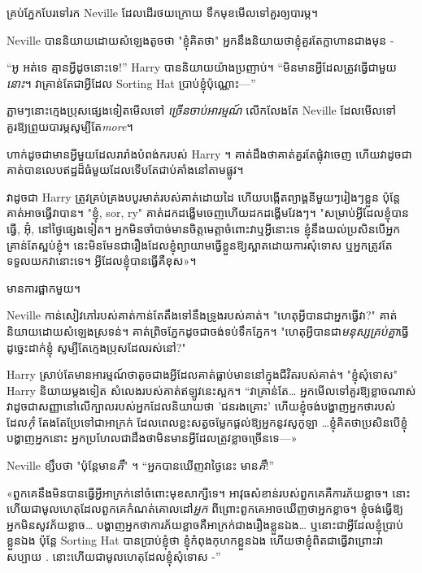{គ្រប់​ភ្នែក​បែរ​ទៅ​រក Neville ដែល​ដើរ​ថយ​ក្រោយ ទឹក​មុខ​មើល​ទៅ​គួរ​ឲ្យ​បារម្ភ។

Neville បាននិយាយដោយសំឡេងតូចថា "ខ្ញុំគិតថា" អ្នកនឹងនិយាយថាខ្ញុំគួរតែក្លាហានជាងមុន -

“អូ អត់ទេ គ្មានអ្វីដូចនោះទេ!” Harry បាននិយាយយ៉ាងប្រញាប់។ “មិនមានអ្វីដែលត្រូវធ្វើជាមួយ\emph{នោះ}។ វាគ្រាន់តែជាអ្វីដែល Sorting Hat ប្រាប់ខ្ញុំប៉ុណ្ណោះ—”

ភ្លាមៗនោះក្មេងប្រុសផ្សេងទៀតមើលទៅ \emph{{ច្រើន}ចាប់អារម្មណ៍} លើកលែងតែ Neville ដែលមើលទៅគួរឱ្យព្រួយបារម្ភសូម្បីតែ\emph{more}។

ហាក់ដូចជាមានអ្វីមួយដែលរារាំងបំពង់ករបស់ Harry ។ គាត់ដឹងថាគាត់គួរតែផ្លុំវាចេញ ហើយវាដូចជាគាត់បានលេបឥដ្ឋដ៏ធំមួយដែលទើបតែជាប់គាំងនៅតាមផ្លូវ។

វាដូចជា Harry ត្រូវគ្រប់គ្រងបបូរមាត់របស់គាត់ដោយដៃ ហើយបង្កើតព្យាង្គនីមួយៗរៀងៗខ្លួន ប៉ុន្តែគាត់អាចធ្វើវាបាន។ "ខ្ញុំ, sor, ry" គាត់ដកដង្ហើមចេញហើយដកដង្ហើមវែងៗ។ "សម្រាប់អ្វីដែលខ្ញុំបានធ្វើ, អ៊ុំ, នៅថ្ងៃផ្សេងទៀត។ អ្នក​មិន​ចាំបាច់​មាន​ចិត្ត​មេត្តា​ចំពោះ​វា​ឬ​អ្វី​នោះ​ទេ ខ្ញុំ​នឹង​យល់​ប្រសិន​បើ​អ្នក​គ្រាន់​តែ​ស្អប់​ខ្ញុំ។ នេះមិនមែនជារឿងដែលខ្ញុំព្យាយាមធ្វើខ្លួនឱ្យស្អាតដោយការសុំទោស ឬអ្នកត្រូវតែទទួលយកវានោះទេ។ អ្វី​ដែល​ខ្ញុំ​បាន​ធ្វើ​គឺ​ខុស»។

មានការផ្អាកមួយ។

Neville កាន់សៀវភៅរបស់គាត់កាន់តែតឹងទៅនឹងទ្រូងរបស់គាត់។ "ហេតុអ្វីបានជាអ្នកធ្វើវា?" គាត់​និយាយ​ដោយ​សំឡេង​ស្រទន់។ គាត់ព្រិចភ្នែកដូចជាចង់ទប់ទឹកភ្នែក។ "ហេតុអ្វីបានជា\emph{មនុស្សគ្រប់គ្នា}ធ្វើដូច្នេះដាក់ខ្ញុំ សូម្បីតែក្មេងប្រុសដែលរស់នៅ?"

Harry ស្រាប់តែមានអារម្មណ៍ថាតូចជាងអ្វីដែលគាត់ធ្លាប់មាននៅក្នុងជីវិតរបស់គាត់។ "ខ្ញុំសុំទោស" Harry និយាយម្តងទៀត សំលេងរបស់គាត់ឥឡូវនេះស្អក។ “វាគ្រាន់តែ… អ្នកមើលទៅគួរឱ្យខ្លាចណាស់ វាដូចជាសញ្ញានៅលើក្បាលរបស់អ្នកដែលនិយាយថា 'ជនរងគ្រោះ' ហើយខ្ញុំចង់បង្ហាញអ្នកថារបស់ដែល\emph{កុំ} តែងតែប្រែទៅជាអាក្រក់ ដែលពេលខ្លះសត្វចម្លែកផ្តល់ឱ្យអ្នកនូវសូកូឡា …ខ្ញុំ​គិត​ថា​ប្រសិន​បើ​ខ្ញុំ​បង្ហាញ​អ្នក​នោះ អ្នក​ប្រហែល​ជា​ដឹង​ថា​មិន​មាន​អ្វី​ដែល​ត្រូវ​ខ្លាច​ច្រើន​ទេ—»

Neville ខ្សឹបថា "ប៉ុន្តែមាន\emph{គឺ}" ។ “អ្នកបានឃើញវាថ្ងៃនេះ មាន\emph{គឺ}!”

«​ពួក​គេ​នឹង​មិន​បាន​ធ្វើ​អ្វី​អាក្រក់​នៅ​ចំពោះ​មុខ​សាក្សី​ទេ។ អាវុធសំខាន់របស់ពួកគេគឺការភ័យខ្លាច។ នោះហើយជាមូលហេតុដែលពួកគេកំណត់គោលដៅ\emph{អ្នក} ពីព្រោះពួកគេអាចឃើញថាអ្នកខ្លាច។ ខ្ញុំចង់ធ្វើឱ្យអ្នកមិនសូវភ័យខ្លាច… បង្ហាញអ្នកថាការភ័យខ្លាចគឺអាក្រក់ជាងរឿងខ្លួនឯង… ឬនោះជាអ្វីដែលខ្ញុំប្រាប់ខ្លួនឯង ប៉ុន្តែ Sorting Hat បានប្រាប់ខ្ញុំថា ខ្ញុំកំពុងកុហកខ្លួនឯង ហើយថាខ្ញុំពិតជាធ្វើវាព្រោះវាសប្បាយ . នោះហើយជាមូលហេតុដែលខ្ញុំសុំទោស -”

}
